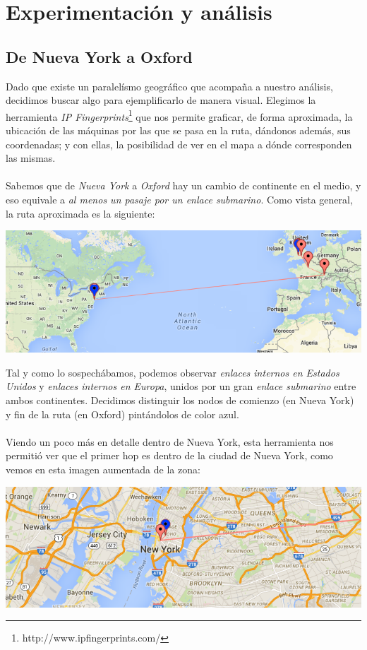 \section{Experimentación y análisis}

\subsection{De Nueva York a Oxford}

Dado que existe un paralelísmo geográfico que acompaña a nuestro análisis, decidimos buscar algo para ejemplificarlo de manera visual. Elegimos la herramienta \textit{IP Fingerprints}\footnote{http://www.ipfingerprints.com/} que nos permite graficar, de forma aproximada, la ubicación de las máquinas por las que se pasa en la ruta, dándonos además, sus coordenadas; y con ellas, la posibilidad de ver en el mapa a dónde corresponden las mismas.\\
\\
\indent Sabemos que de \textit{Nueva York} a \textit{Oxford} hay un cambio de continente en el medio, y eso equivale a \textit{al menos un pasaje por un enlace submarino}. Como vista general, la ruta aproximada es la siguiente:
\begin{center}
	\includegraphics[scale=0.6]{graphics/new_york-oxford.png}
\end{center}

Tal y como lo sospechábamos, podemos observar \textit{enlaces internos en Estados Unidos} y \textit{enlaces internos en Europa}, unidos por un gran \textit{enlace submarino} entre ambos continentes. Decidimos distinguir los nodos de comienzo (en Nueva York) y fin de la ruta (en Oxford) pintándolos de color azul.\\
\\
\indent Viendo un poco más en detalle dentro de Nueva York, esta herramienta nos permitió ver que el primer hop es dentro de la ciudad de Nueva York, como vemos en esta imagen aumentada de la zona:

\begin{center}
	\includegraphics[scale=0.6]{graphics/new_york_zoom.png}
\end{center}

